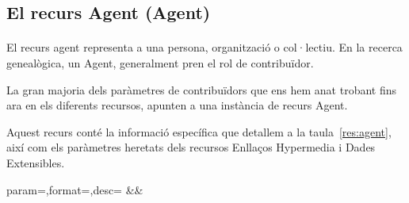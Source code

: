 \subsection{El recurs Agent (Agent)}

    \paragraph{}
    El recurs agent representa a una persona, organització o col·lectiu. En la recerca genealògica, un Agent, generalment pren el rol de contribuïdor.

    La gran majoria dels paràmetres de contribuïdors que ens hem anat trobant fins ara en els diferents recursos, apunten a una instància de recurs Agent.

    Aquest recurs conté la informació específica que detallem a la taula~\ref{res:agent}, així com els paràmetres heretats dels recursos Enllaços Hypermedia i Dades Extensibles.

    \begin{center}
             {param=\param,format=\format,desc=\desc}
             {\param&\format&\desc}
     \end{center}

